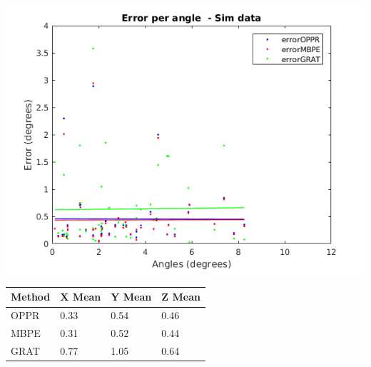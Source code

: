 \begin{minipage}{0.33\textwidth}
	\centering
	\includegraphics[width=\textwidth]{images/sim/10anglez.png}
	\label{cha5:sec1:10anglez}
\end{minipage}
\begin{table}
	\centering
	\begin{tabular}{| l | l | l | l |}
		\hline
		Method & X Mean & Y Mean & Z Mean \\
		\hline
		OPPR &  0.33 \degree & 0.54 \degree & 0.46 \degree \\
		\hline
		MBPE &  0.31 \degree & 0.52 \degree & 0.44 \degree\\
		\hline
		GRAT &  0.77 \degree & 1.05 \degree & 0.64 \degree\\ 
		\hline
	\end{tabular}
	\label{cha5:sec1:10angleaxist}
\end{table}		



